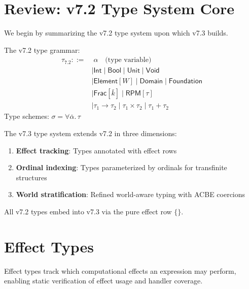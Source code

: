 \section{Review: v7.2 Type System Core}
\label{sec:review-v72-types}

We begin by summarizing the v7.2 type system upon which v7.3 builds.

\begin{definition}
\label{def:v72-type-recap}
The v7.2 type grammar:
\begin{align}
\tau_{7.2} ::=&\; \alpha \quad \text{(type variable)} \\
    &\mid \mathsf{Int} \mid \mathsf{Bool} \mid \mathsf{Unit} \mid \mathsf{Void} \\
    &\mid \mathsf{Element}[W] \mid \mathsf{Domain} \mid \mathsf{Foundation} \\
    &\mid \mathsf{Frac}[\bar{k}] \mid \mathsf{RPM}[\tau] \\
    &\mid \tau_1 \to \tau_2 \mid \tau_1 \times \tau_2 \mid \tau_1 + \tau_2
\end{align}
Type schemes: $\sigma = \forall \bar{\alpha}.\, \tau$
\end{definition}

\begin{remark}
\label{rem:type-extension}
The v7.3 type system extends v7.2 in three dimensions:
\begin{enumerate}
  \item \textbf{Effect tracking}: Types annotated with effect rows
  \item \textbf{Ordinal indexing}: Types parameterized by ordinals for transfinite structures
  \item \textbf{World stratification}: Refined world-aware typing with ACBE coercions
\end{enumerate}
All v7.2 types embed into v7.3 via the pure effect row $\{\}$.
\end{remark}

\section{Effect Types}
\label{sec:effect-types}

Effect types track which computational effects an expression may perform, enabling static verification of effect usage and handler coverage.

